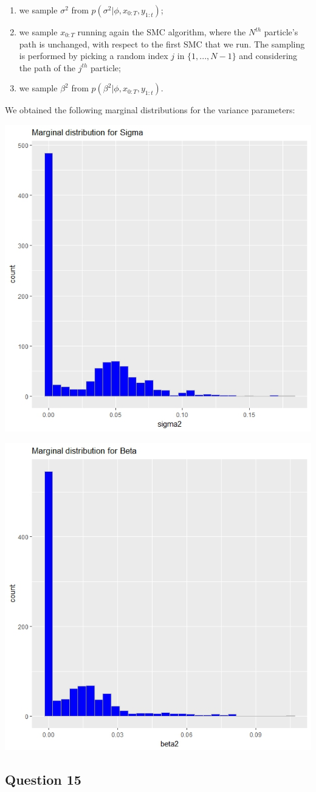 \documentclass[]{article}
\begin{document}
	\begin{enumerate}
		
		\item we sample $\sigma^2$ from $p(\sigma^2|\phi, x_{0:T}, y_{1:t})$;
		
		\item we sample $x_{0:T}$ running again the SMC algorithm, where  the $N^{th}$ particle's path is unchanged, with respect to the first SMC that we run. The sampling is performed by picking a random index $j$ in $\{1,...,N-1\}$ and considering the path of the $j^{th}$ particle;
		
		\item we sample $\beta^2$ from $p(\beta^2|\phi, x_{0:T}, y_{1:t})$.
		
	\end{enumerate}
	
	
	We obtained the following marginal distributions for the variance parameters:
	
	\begin{center}
		
		\includegraphics[width=.4\textwidth]{task5/CSMC_sigma2.jpeg}
		
		\includegraphics[width=.4\textwidth]{task5/CSMC_beta2.jpeg}
		
	\end{center}
	
	
	\subsection*{Question 15}
	
\end{document}
